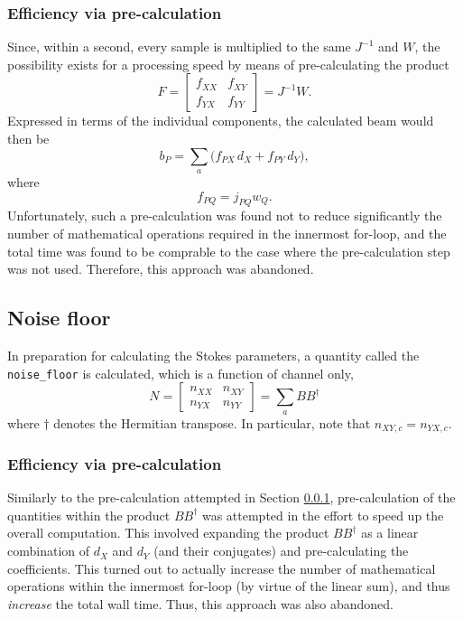 \documentclass{article}
\begin{document}
\subsubsection{Efficiency via pre-calculation}
\label{sec:precalc1}
Since, within a second, every sample is multiplied to the same $J^{-1}$ and $W$, the possibility exists for a processing speed by means of pre-calculating the product
\begin{equation}
    F = \begin{bmatrix} f_{XX} & f_{XY} \\ f_{YX} & f_{YY} \end{bmatrix} = J^{-1} W.
\end{equation}
Expressed in terms of the individual components, the calculated beam would then be
\begin{equation}
    b_P = \sum_a \bigg(f_{PX} \, d_X + f_{PY} \, d_Y\bigg),
\end{equation}
where
\begin{equation}
    f_{PQ} = j_{PQ} w_Q.
\end{equation}
Unfortunately, such a pre-calculation was found not to reduce significantly the number of mathematical operations required in the innermost for-loop, and the total time was found to be comprable to the case where the pre-calculation step was not used.
Therefore, this approach was abandoned.

\subsection{Noise floor}
In preparation for calculating the Stokes parameters, a quantity called the \texttt{noise\_floor} is calculated, which is a function of channel only,
\begin{equation}
    N = \begin{bmatrix} n_{XX} & n_{XY} \\ n_{YX} & n_{YY} \end{bmatrix}
      = \sum_a BB^\dagger
\end{equation}
where $\dagger$ denotes the Hermitian transpose.
In particular, note that $n_{XY,c} = n_{YX,c}$.

\subsubsection{Efficiency via pre-calculation}
Similarly to the pre-calculation attempted in Section \ref{sec:precalc1}, pre-calculation of the quantities within the product $BB^\dagger$ was attempted in the effort to speed up the overall computation.
This involved expanding the product $BB^\dagger$ as a linear combination of $d_X$ and $d_Y$ (and their conjugates) and pre-calculating the coefficients.
This turned out to actually increase the number of mathematical operations within the innermost for-loop (by virtue of the linear sum), and thus \emph{increase} the total wall time.
Thus, this approach was also abandoned.
\end{document}
